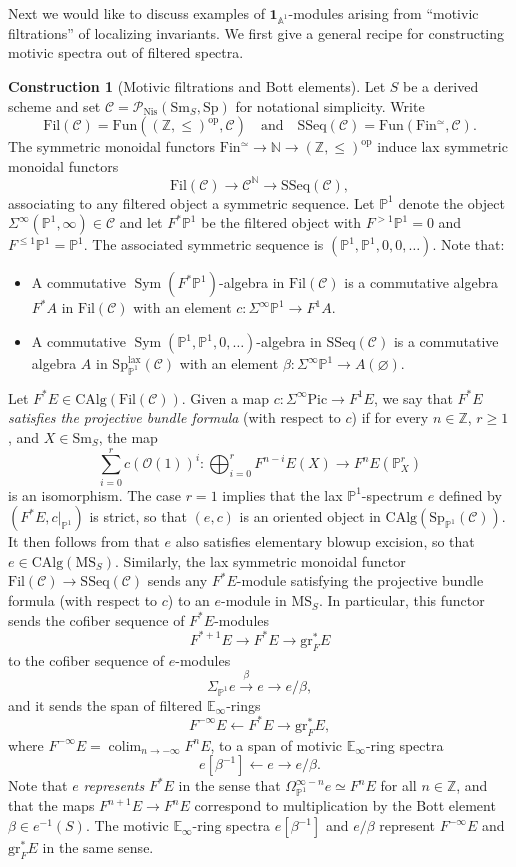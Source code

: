 \documentclass{amsart}
\numberwithin{equation}{section}
\theoremstyle{plain}
\theoremstyle{definition}
\newtheorem{construction}[equation]{Construction}
\let\scr=\mathcal
\let\bb=\mathbb
\def\N{\bb N}
\def\Z{\bb Z}
\def\A{\bb A}
\def\P{\bb P}
\def\1{\mathbf 1}
\let\emptyset=\varnothing
\DeclareMathOperator{\Sym}{Sym}
\def\Pic{\mathrm{Pic}}
\def\E{\mathbb{E}}
\def\SSeq{\mathrm{SSeq}}
\def\Nis{\mathrm{Nis}}
\let\cat=\mathrm
\def\Sm{{\cat{S}\mathrm{m}}}
\def\Fin{\cat F\mathrm{in}}
\def\op{\mathrm{op}}
\def\gr{\mathrm{gr}}
\def\Fil{\mathrm{Fil}}
\def\MS{\mathrm{MS}}
\def\Sp{\mathrm{Sp}}
\def\CAlg{\mathrm{CAlg}{}}
\def\Fun{\mathrm{Fun}}
\newcommand{\CC}{\mathcal{C}}
\newcommand{\lax}{\mathrm{lax}}
\DeclareMathOperator*{\colim}{colim}
\begin{document}
Next we would like to discuss examples of $\1_{\A^1}$-modules arising from ``motivic filtrations'' of localizing invariants.
We first give a general recipe for constructing motivic spectra out of filtered spectra.

\begin{construction}[Motivic filtrations and Bott elements]
	\label{cst:motivic-filtration}
	Let $S$ be a derived scheme and set $\CC=\scr{P}_\Nis(\Sm_S,\Sp)$ for notational simplicity. Write 
	\[
	\Fil(\scr C)=\Fun((\Z,\leq)^\op,\scr C) \quad\text{and}\quad \SSeq(\scr C)=\Fun(\Fin^\simeq,\scr C).
	\]
	The symmetric monoidal functors $\Fin^\simeq\to\N\to (\Z,\leq)^\op$ induce lax symmetric monoidal functors
	\[
	\Fil(\scr C)\to \scr C^\N \to \SSeq(\scr C),
	\]
	associating to any filtered object a symmetric sequence.
	Let $\P^1$ denote the object $\Sigma^\infty(\P^1,\infty)\in\scr C$ and let $F^*\P^1$ be the filtered object with $F^{> 1}\P^1=0$ and $F^{\leq 1}\P^1=\P^1$. The associated symmetric sequence is $(\P^1,\P^1,0,0,\dotsc)$.
	Note that:
	\begin{itemize}
		\item A commutative $\Sym(F^*\P^1)$-algebra in $\Fil(\scr C)$ is a commutative algebra $F^*A$ in $\Fil(\scr C)$ with an element $c\colon \Sigma^\infty\P^1\to F^1A$.
		\item A commutative $\Sym(\P^1,\P^1,0,\dotsc)$-algebra in $\SSeq(\scr C)$ is a commutative algebra $A$ in $\Sp_{\P^1}^\lax(\scr C)$ with an element $\beta\colon \Sigma^\infty\P^1\to A(\emptyset)$.
	\end{itemize}
	Let $F^*E\in\CAlg(\Fil(\scr C))$. Given a map $c\colon \Sigma^\infty\Pic\to F^1E$, we say that $F^*E$ \emph{satisfies the projective bundle formula} (with respect to $c$) if for every $n\in\Z$, $r\geq 1$, and $X\in\Sm_S$, the map
	\[
		\sum_{i=0}^r c(\scr O(1))^i \colon \bigoplus_{i=0}^r F^{n-i}E(X) \to F^{n}E(\P^r_X)
	\]
	is an isomorphism. The case $r=1$ implies that the lax $\P^1$-spectrum $e$ defined by $(F^*E,c|_{\P^1})$ is strict, so that $(e,c)$ is an oriented object in $\CAlg(\Sp_{\P^1}(\scr C))$. It then follows from \cite[Lemma 3.3.5]{AnnalaIwasa2} that $e$ also satisfies elementary blowup excision, so that $e\in\CAlg(\MS_S)$. 
	Similarly, the lax symmetric monoidal functor $\Fil(\scr C)\to\SSeq(\scr C)$ sends any $F^*E$-module satisfying the projective bundle formula (with respect to $c$) to an $e$-module in $\MS_S$. In particular, this functor sends the cofiber sequence of $F^*E$-modules
	\[
	F^{*+1}E\to F^*E \to \gr_F^*E
	\]
	to the cofiber sequence of $e$-modules
	\[
	\Sigma_{\P^1}e \xrightarrow{\beta} e \to e/\beta,
	\]
	and it sends the span of filtered $\E_\infty$-rings
	\[
	F^{-\infty}E \leftarrow F^*E \to \gr_F^* E,
	\]
	where $F^{-\infty}E=\colim_{n\to-\infty} F^nE$, to a span of motivic $\E_\infty$-ring spectra
	\[
	e[\beta^{-1}] \leftarrow e \to e/\beta.
	\]
	Note that $e$ \emph{represents} $F^*E$ in the sense that $\Omega_{\P^1}^{\infty-n}e\simeq F^nE$ for all $n\in \Z$, and that the maps $F^{n+1}E\to F^nE$ correspond to multiplication by the Bott element $\beta\in e^{-1}(S)$. The motivic $\E_\infty$-ring spectra $e[\beta^{-1}]$ and $e/\beta$ represent $F^{-\infty}E$ and $\gr_F^* E$ in the same sense.
\end{construction}
\end{document}
